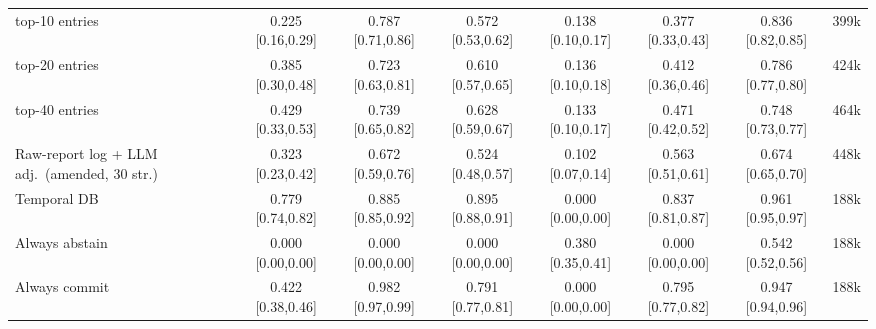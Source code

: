 \begin{table}
\begin{tabular}{lccccccc}
\quad top-10 entries & 0.225 {\tiny[0.16,0.29]} & 0.787 {\tiny[0.71,0.86]} & 0.572 {\tiny[0.53,0.62]} & 0.138 {\tiny[0.10,0.17]} & 0.377 {\tiny[0.33,0.43]} & 0.836 {\tiny[0.82,0.85]} & 399k \\
\quad top-20 entries & 0.385 {\tiny[0.30,0.48]} & 0.723 {\tiny[0.63,0.81]} & 0.610 {\tiny[0.57,0.65]} & 0.136 {\tiny[0.10,0.18]} & 0.412 {\tiny[0.36,0.46]} & 0.786 {\tiny[0.77,0.80]} & 424k \\
\quad top-40 entries & 0.429 {\tiny[0.33,0.53]} & 0.739 {\tiny[0.65,0.82]} & 0.628 {\tiny[0.59,0.67]} & 0.133 {\tiny[0.10,0.17]} & 0.471 {\tiny[0.42,0.52]} & 0.748 {\tiny[0.73,0.77]} & 464k \\
Raw-report log + LLM adj.\ (amended, 30 str.) & 0.323 {\tiny[0.23,0.42]} & 0.672 {\tiny[0.59,0.76]} & 0.524 {\tiny[0.48,0.57]} & 0.102 {\tiny[0.07,0.14]} & 0.563 {\tiny[0.51,0.61]} & 0.674 {\tiny[0.65,0.70]} & 448k \\
Temporal DB & 0.779 {\tiny[0.74,0.82]} & 0.885 {\tiny[0.85,0.92]} & 0.895 {\tiny[0.88,0.91]} & 0.000 {\tiny[0.00,0.00]} & 0.837 {\tiny[0.81,0.87]} & 0.961 {\tiny[0.95,0.97]} & 188k \\
Always abstain & 0.000 {\tiny[0.00,0.00]} & 0.000 {\tiny[0.00,0.00]} & 0.000 {\tiny[0.00,0.00]} & 0.380 {\tiny[0.35,0.41]} & 0.000 {\tiny[0.00,0.00]} & 0.542 {\tiny[0.52,0.56]} & 188k \\
Always commit & 0.422 {\tiny[0.38,0.46]} & 0.982 {\tiny[0.97,0.99]} & 0.791 {\tiny[0.77,0.81]} & 0.000 {\tiny[0.00,0.00]} & 0.795 {\tiny[0.77,0.82]} & 0.947 {\tiny[0.94,0.96]} & 188k \\
\bottomrule
\end{tabular}
\end{table}